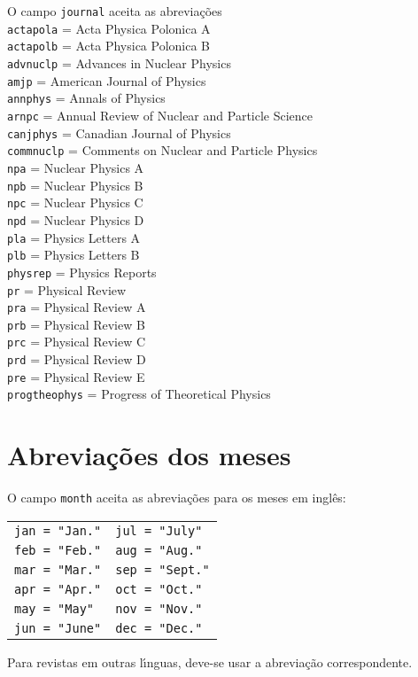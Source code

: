 \documentclass[a4paper,12pt]{article}
\newcommand{\ii}{\'{\i}}
\newcommand{\ca}{\c{c}\~ao}
\newcommand{\co}{\c{c}\~oes}
\newcommand{\identacao}{\\[1mm] \hspace*{3cm}}
\begin{document}
O campo \verb+journal+ aceita as abrevia{\co}
\identacao
{\verb+actapola+} = {Acta Physica Polonica A}
\identacao
{\verb+actapolb+} = {Acta Physica Polonica B}
\identacao
{\verb+advnuclp+} = {Advances in Nuclear Physics}
\identacao
{\verb+amjp+} = {American Journal of Physics}
\identacao
{\verb+annphys+} = {Annals of Physics}
\identacao
{\verb+arnpc+} = {Annual Review of Nuclear and Particle Science}
\identacao
{\verb+canjphys+} = {Canadian Journal of Physics}
\identacao
{\verb+commnuclp+} = {Comments on Nuclear and Particle Physics}
\identacao
{\verb+npa+} = {Nuclear Physics A}
\identacao
{\verb+npb+} = {Nuclear Physics B}
\identacao
{\verb+npc+} = {Nuclear Physics C}
\identacao
{\verb+npd+} = {Nuclear Physics D}
\identacao
{\verb+pla+} = {Physics Letters A}
\identacao
{\verb+plb+} = {Physics Letters B}
\identacao
{\verb+physrep+} = {Physics Reports}
\identacao
{\verb+pr+} = {Physical Review}
\identacao
{\verb+pra+} = {Physical Review A}
\identacao
{\verb+prb+} = {Physical Review B}
\identacao
{\verb+prc+} = {Physical Review C}
\identacao
{\verb+prd+} = {Physical Review D}
\identacao
{\verb+pre+} = {Physical Review E}
\identacao
{\verb+progtheophys+} = {Progress of Theoretical Physics}
\begin{comment}
\identacao
{\verb+zfpa+} = {Zeitschrift f\"ur Physik A}
\identacao
{\verb+zfpb+} = {Zeitschrift f\"ur Physik B}
\identacao
{\verb+zfpc+} = {Zeitschrift f\"ur Physik C}
\end{comment}




\section{Abrevia{\co} dos meses}
\label{sec_mes}


O campo \verb+month+ aceita as abrevia{\co} para os meses em ingl\^es:
\begin{center}
\begin{tabular}{l@{\hspace{1.2cm}}l}
\verb+jan = "Jan."+  & \verb+jul = "July"+ \\
\verb+feb = "Feb."+  & \verb+aug = "Aug."+ \\
\verb+mar = "Mar."+  & \verb+sep = "Sept."+ \\
\verb+apr = "Apr."+  & \verb+oct = "Oct."+ \\
\verb+may = "May"+   & \verb+nov = "Nov."+ \\
\verb+jun = "June"+  & \verb+dec = "Dec."+
\end{tabular}
\end{center}
Para revistas em outras l{\ii}nguas, deve-se usar a abrevia{\ca}
correspondente. 



%


%
%
\end{document}
